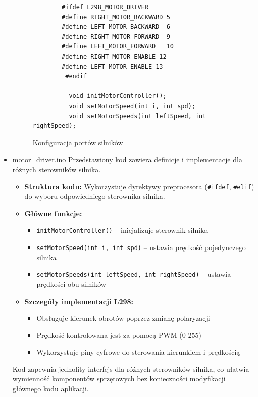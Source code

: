 \documentclass[a4paper,twoside,12pt]{book}
\begin{document}
\begin{itemize}
\begin{figure}[!hb]
\begin{lstlisting}
		#ifdef L298_MOTOR_DRIVER
		#define RIGHT_MOTOR_BACKWARD 5
		#define LEFT_MOTOR_BACKWARD  6
		#define RIGHT_MOTOR_FORWARD  9
		#define LEFT_MOTOR_FORWARD   10
		#define RIGHT_MOTOR_ENABLE 12
		#define LEFT_MOTOR_ENABLE 13	
		 #endif
		  
		  void initMotorController();
		  void setMotorSpeed(int i, int spd);
		  void setMotorSpeeds(int leftSpeed, int rightSpeed);
		\end{lstlisting}
		\caption{Konfiguracja portów silników}
		\label{fig:Konfiguracja portów silników}
		\end{figure}
		





	\item motor\_driver.ino
	Przedstawiony kod zawiera definicje i implementacje dla różnych sterowników silnika.

	\begin{itemize}
		\item \textbf{Struktura kodu:} Wykorzystuje dyrektywy preprocesora (\texttt{\#ifdef}, \texttt{\#elif}) do wyboru odpowiedniego sterownika silnika.
		
		\item \textbf{Główne funkcje:}
		\begin{itemize}
			\item \texttt{initMotorController()} -- inicjalizuje sterownik silnika
			\item \texttt{setMotorSpeed(int i, int spd)} -- ustawia prędkość pojedynczego silnika
			\item \texttt{setMotorSpeeds(int leftSpeed, int rightSpeed)} -- ustawia prędkości obu silników
		\end{itemize}
		
		\item \textbf{Szczegóły implementacji L298:}
		\begin{itemize}
			\item Obsługuje kierunek obrotów poprzez zmianę polaryzacji
			\item Prędkość kontrolowana jest za pomocą PWM (0-255)
			\item Wykorzystuje piny cyfrowe do sterowania kierunkiem i prędkością
		\end{itemize}
	\end{itemize}
	
	Kod zapewnia jednolity interfejs dla różnych sterowników silnika, co ułatwia wymienność komponentów sprzętowych bez konieczności modyfikacji głównego kodu aplikacji.
	



\end{itemize}
\end{document}
